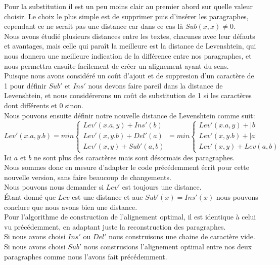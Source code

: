 \documentclass{article}
\begin{document}
Pour la substitution il est un peu moins clair au premier abord sur quelle
valeur choisir. Le choix le plus simple est de supprimer puis d'insérer les
paragraphes, cependant ce ne serait pas une distance car dans ce cas là
$Sub(x,x) \neq 0$.\\
Nous avons étudié plusieurs distances entre les textes, chacunes avec leur
défauts et avantages, mais celle qui paraît la meilleure est la distance de
Levenshtein, qui nous donnera une meilleure indication de la différence entre
nos paragraphes, et nous permettra ensuite facilement de créer un alignement
ayant du sens.\\
Puisque nous avons considéré un coût d'ajout et de suppresion d'un caractère de
1 pour définir $Sub'$ et $Ins'$ nous devons faire pareil dans la distance de
Levenshtein, et nous considérerons un coût de substitution de 1 si les
caractères dont différents et 0 sinon.\\

Nous pouvons ensuite définir notre nouvelle distance de Levenshtein comme suit:
\begin{equation*}
	Lev'(x.a,y.b)= min
		\begin{cases}
			Lev'(x.a,y) + Ins'(b)\\
			Lev'(x,y.b) + Del'(a)\\
			Lev'(x,y) + Sub'(a,b)
		\end{cases}
		= min
		\begin{cases}
			Lev'(x.a,y) + \lvert b \rvert\\
			Lev'(x,y.b) + \lvert a \rvert\\
			Lev'(x,y) + Lev(a,b)
		\end{cases}
\end{equation*}
Ici $a$ et $b$ ne sont plus des caractères mais sont désormais des
paragraphes.\\
Nous sommes donc en mesure d'adapter le code précédemment écrit pour cette
nouvelle version, sans faire beaucoup de changements.\\

Nous pouvons nous demander si $Lev'$ est toujours une distance.\\
Étant donné que $Lev$ est une distance et aue $Sub'(x)=Ins'(x)$ nous pouvons
conclure que nous avons bien une distance.\\


Pour l'algorithme de construction de l'alignement optimal, il est identique à
celui vu précédemment, en adaptant juste la reconstruction des paragraphes.\\
Si nous avons choisi $Ins'$ ou $Del'$ nous construisons une chaine de caractère
vide.\\
Si nous avons choisi $Sub'$ nous construsions l'alignement optimal entre nos
deux paragraphes comme nous l'avons fait précédemment.
\end{document}
